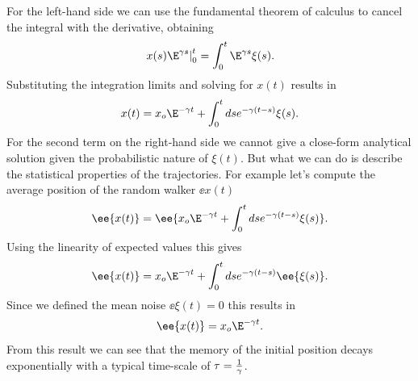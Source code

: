 For the left-hand side we can use the fundamental theorem of calculus to cancel
the integral with the derivative, obtaining
\begin{equation}
  \left. x(s)\E^{\gamma s} \right\vert_{0}^{t} =
  \int_0^t \E^{\gamma s} \xi(s).
\end{equation}
Substituting the integration limits and solving for $x(t)$ results in
\begin{equation}
  x(t) = x_o \E^{-\gamma t} + \int_0^t ds e^{-\gamma (t - s)} \xi(s).
  \label{eq_random_walk_sol}
\end{equation}
For the second term on the right-hand side we cannot give a close-form
analytical solution given the probabilistic nature of $\xi(t)$. But what we can
do is describe the statistical properties of the trajectories. For example
let's compute the average position of the random walker $\ee{x(t)}$
\begin{equation}
  \ee{x(t)} = \ee{x_o \E^{-\gamma t} + \int_0^t ds e^{-\gamma (t - s)} \xi(s)}.
\end{equation}
Using the linearity of expected values this gives
\begin{equation}
  \ee{x(t)} = x_o \E^{-\gamma t} +\int_0^t ds e^{-\gamma (t - s)} \ee{\xi(s)}.
\end{equation}
Since we defined the mean noise $\ee{\xi(t)} = 0$ this results in
\begin{equation}
  \ee{x(t)} = x_o \E^{-\gamma t}.
\end{equation}
From this result we can see that the memory of the initial position decays
exponentially with a typical time-scale of $\tau = {1 \over \gamma}$.
